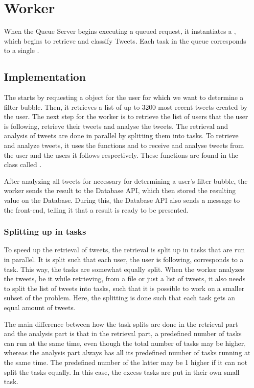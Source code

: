 \chapter{Worker}\label{workerLabel}
When the Queue Server begins executing a queued request, it instantiates a
, which begins to retrieve and classify Tweets. Each task in the
queue corresponds to a single .

\section{Implementation}
The  starts by requesting a  object for the user for
which we want to determine a filter bubble. Then, it retrieves a list of up to
3200 most recent tweets created by the user. The next step for the worker is to
retrieve the list of users that the user is following, retrieve their tweets and
analyse the tweets. The retrieval and analysis of tweets are done in parallel by
splitting them into tasks. To retrieve and analyze tweets, it uses the functions
 and 
to receive and analyse tweets from the user and the users it follows
respectively. These functions are found in the class called
.\nl

After analyzing all tweets for necessary for determining a user's filter bubble,
the worker sends the result to the Database API, which then stored the resulting
value on the Database. During this, the Database API also sends a message to the
front-end, telling it that a result is ready to be presented.

\subsection{Splitting up in tasks}\label{sec:taskSplit}
To speed up the retrieval of tweets, the retrieval is split up in tasks that are
run in parallel. It is split such that each user, the user is following,
corresponds to a task. This way, the tasks are somewhat equally split.
When the worker analyzes the tweets, be it while retrieving, from a file or just
a list of tweets, it also needs to split the list of tweets into tasks, such
that it is possible to work on a smaller subset of the problem. Here, the
splitting is done such that each task gets an equal amount of tweets.

The main difference between how the task splits are done in the retrieval
part and the analysis part is that in the retrieval part, a predefined number
of tasks can run at the same time, even though the total number of tasks may be
higher, whereas the analysis part always has all its predefined number of tasks
running at the same time. The predefined number of the latter may be 1 higher if
it can not split the tasks equally. In this case, the excess tasks are put in
their own small task.

